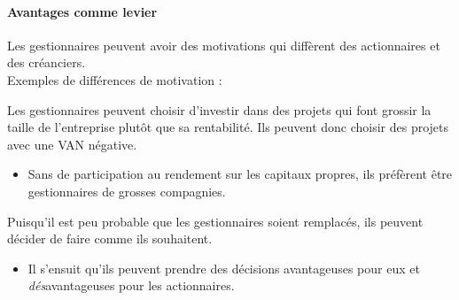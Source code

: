 \documentclass[10pt, french]{article}
\begin{document}
\begin{multicols*}{2}
\paragraph{Avantages comme levier}	
Les gestionnaires peuvent avoir des motivations qui diffèrent des actionnaires et des créanciers.	\\

Exemples de différences de motivation :
\begin{definitionNOHFILLprop}
Les gestionnaires peuvent choisir d'investir dans des projets qui font grossir la taille de l'entreprise plutôt que sa rentabilité.  Ils peuvent donc choisir des projets avec une VAN négative.	\\

\begin{itemize}
	\item	Sans de participation au rendement sur les capitaux propres, ils préfèrent être gestionnaires de grosses compagnies.
\end{itemize}
\end{definitionNOHFILLprop}

\begin{definitionNOHFILLprop}
Puisqu'il est peu probable que les gestionnaires soient remplacés, ils peuvent décider de faire comme ils souhaitent.	\\

\begin{itemize}
	\item	Il s'ensuit qu'ils peuvent prendre des décisions avantageuses pour eux et \textit{dés}avantageuses pour les actionnaires.
\end{itemize}
\end{definitionNOHFILLprop}

\


\end{multicols*}
\end{document}
